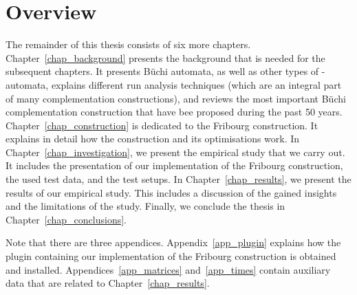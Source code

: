
\section{Overview}
\label{1_overview}
The remainder of this thesis consists of six more chapters. Chapter~\ref{chap_background} presents the background that is needed for the subsequent chapters. It presents Büchi automata, as well as other types of \om-automata, explains different run analysis techniques (which are an integral part of many complementation constructions), and reviews the most important Büchi complementation construction that have bee proposed during the past 50 years. Chapter~\ref{chap_construction} is dedicated to the Fribourg construction. It explains in detail how the construction and its optimisations work. In Chapter~\ref{chap_investigation}, we present the empirical study that we carry out. It includes the presentation of our implementation of the Fribourg construction, the used test data, and the test setups. In Chapter~\ref{chap_results}, we present the results of our empirical study. This includes a discussion of the gained insights and the limitations of the study. Finally, we conclude the thesis in Chapter~\ref{chap_conclusions}.

Note that there are three appendices. Appendix~\ref{app_plugin} explains how the plugin containing our implementation of the Fribourg construction is obtained and installed. Appendices~\ref{app_matrices} and~\ref{app_times} contain auxiliary data that are related to Chapter~\ref{chap_results}.






